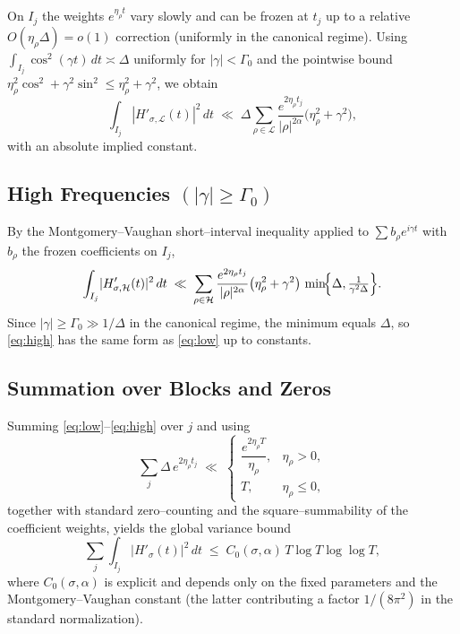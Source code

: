 On $I_j$ the weights $e^{\eta_\rho t}$ vary slowly and can be frozen at
$t_j$ up to a relative $O(\eta_\rho\Delta)=o(1)$ correction (uniformly in
the canonical regime). Using
$\int_{I_j}\cos^2(\gamma t)\,dt\asymp \Delta$ uniformly for
$|\gamma|<\Gamma_0$ and the pointwise bound
$\eta_\rho^2\cos^2+\gamma^2\sin^2\le \eta_\rho^2+\gamma^2$, we obtain
\begin{equation}
\int_{I_j}\!|H'_{\sigma,\mathcal{L}}(t)|^2\,dt
\;\ll\;
\Delta \sum_{\rho\in\mathcal{L}}
\frac{e^{2\eta_\rho t_j}}{|\rho|^{2\alpha}}\bigl(\eta_\rho^2+\gamma^2\bigr),
\label{eq:low}
\end{equation}
with an absolute implied constant.

\subsection{High Frequencies \texorpdfstring{$(|\gamma|\ge\Gamma_0)$}{(high)}}

By the Montgomery–Vaughan short–interval inequality applied to
$\sum b_\rho e^{i\gamma t}$ with $b_\rho$ the frozen coefficients on $I_j$,
\begin{equation}
\int_{I_j}\!|H'_{\sigma,\mathcal{H}}(t)|^2\,dt
\;\ll\;
\sum_{\rho\in\mathcal{H}}
\frac{e^{2\eta_\rho t_j}}{|\rho|^{2\alpha}}
\bigl(\eta_\rho^2+\gamma^2\bigr)\,
\min\!\Bigl\{\Delta,\tfrac{1}{\gamma^2\Delta}\Bigr\}.
\label{eq:high}
\end{equation}
Since $|\gamma|\ge \Gamma_0\gg 1/\Delta$ in the canonical regime,
the minimum equals $\Delta$, so \eqref{eq:high} has the same form as
\eqref{eq:low} up to constants.

\subsection{Summation over Blocks and Zeros}

Summing \eqref{eq:low}–\eqref{eq:high} over $j$ and using
\[
\sum_{j} \Delta\, e^{2\eta_\rho t_j}
\;\ll\;
\begin{cases}
\dfrac{e^{2\eta_\rho T}}{\eta_\rho}, & \eta_\rho>0,\\[6pt]
T, & \eta_\rho\le 0,
\end{cases}
\]
together with standard zero–counting and the square–summability of the
coefficient weights, yields the global variance bound
\begin{equation}
\sum_j\int_{I_j}\!|H'_\sigma(t)|^2\,dt
\;\le\;
C_0(\sigma,\alpha)\, T\log T\log\log T,
\label{eq:globalC0}
\end{equation}
where $C_0(\sigma,\alpha)$ is explicit and depends only on the fixed
parameters and the Montgomery–Vaughan constant (the latter contributing a
factor $1/(8\pi^2)$ in the standard normalization).

